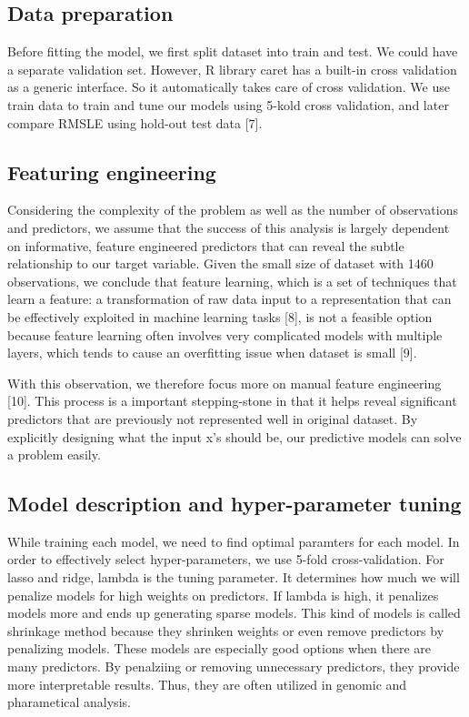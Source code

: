 \documentclass[letterpaper, 10 pt, conference]{ieeeconf}\usepackage[]{graphicx}\usepackage[]{color}
\begin{document}
\subsection{Data preparation}
Before fitting the model, we first split dataset into train and test. We could have a separate validation set. However,  R library caret has a built-in cross validation as a generic interface. So it automatically takes care of cross validation. We use train data to train and tune our models using 5-kold cross validation, and later compare RMSLE using hold-out test data [7].

\subsection{Featuring engineering}

Considering the complexity of the problem as well as the number of observations and predictors, we assume that the success of this analysis is largely dependent on informative, feature engineered predictors that can reveal the subtle relationship to our target variable. Given the small size of dataset with 1460 observations, we conclude that feature learning, which is a set of techniques that learn a feature: a transformation of raw data input to a representation that can be effectively exploited in machine learning tasks [8], is not a feasible option because feature learning often involves very complicated models with multiple layers, which tends to cause an overfitting issue when dataset is small [9].

With this observation, we therefore focus more on manual feature engineering [10]. This process is a important stepping-stone in that it helps reveal significant predictors that are previously not represented well in original dataset. By explicitly designing what the input x's should be, our predictive models can solve a problem easily. 

\subsection{Model description and hyper-parameter tuning}
While training each model, we need to find optimal paramters for each model. In order to effectively select hyper-parameters, we use 5-fold cross-validation. For lasso and ridge, lambda is the tuning parameter. It determines how much we will penalize models for high weights on predictors. If lambda is high, it penalizes models more and ends up generating sparse models. This kind of models is called shrinkage method because they shrinken weights or even remove predictors by penalizing models. These models are especially good options when there are many predictors. By penalziing or removing unnecessary predictors, they provide more interpretable results. Thus, they are often utilized in genomic and pharametical analysis.
\end{document}
